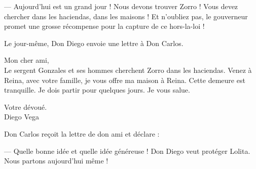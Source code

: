 --- Aujourd'hui est un grand jour ! Nous devons trouver Zorro ! Vous devez chercher dans les haciendas, dans les maisons ! Et
    n'oubliez pas, le gouverneur promet une grosse récompense pour la capture de ce hors-la-loi !

Le jour-même, Don Diego envoie une lettre à Don Carlos.



Mon cher ami,\\
Le sergent Gonzales et ses hommes cherchent Zorro dans les haciendas. Venez à Reina, avec votre famille, je vous offre ma maison à
Reina. Cette demeure est tranquille. Je dois partir pour quelques jours. Je vous salue.

Votre dévoué.\\
Diego Vega



Don Carlos reçoit la lettre de don ami et déclare :

--- Quelle bonne idée et quelle idée généreuse ! Don Diego veut protéger Lolita. Nous partons aujourd'hui même !
